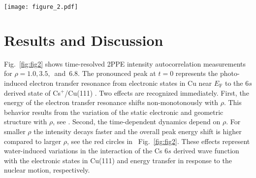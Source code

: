 \documentclass[aps,twocolumn,amssymb,amsfonts,amsmath,showpacs,final,a4paper,superscriptaddress]{revtex4-2}
\begin{document}
\begin{figure*}[t]
    \centering
    \texttt{[image: figure\_2.pdf]}
    \caption{The panels (a-c) depict measured data sets of time-resolved 2PPE intensity autocorrelations with increasing coverage ratio $\rho$ (number of water molecules per adsorbed ion) after subtraction of a time-independent background signal. In each individual panel, the intensity is shown in a false color representation as a function of time delay and intermediate state energy $E-E_{\mathrm{F}}$ at left and as spectra at selected time delays after averaging negative and positive time delays at right. The open red circles indicate the energy of the intensity maxima at the respective time delay. The data were recorded at a temperature of 80~K.}
    \label{fig:fig2}
\end{figure*}

\section {Results and Discussion}

Fig.~\ref{fig:fig2} shows time-resolved 2PPE intensity autocorrelation measurements for $\rho=1.0, 3.5,$~and~6.8. The pronounced peak at $t=0$ represents the photo-induced electron transfer resonance from electronic states in Cu near $E_{\mathrm{F}}$ to the $6s$ derived state of Cs$^+$/Cu(111) \cite{gauyacq_2007}. Two effects are recognized immediately. First, the energy of the electron transfer resonance shifts non-monotonously with $\rho$. This behavior results from the variation of the static electronic and geometric structure with $\rho$, see \cite{penschke_2023}. Second, the time-dependent dynamics depend on $\rho$. For smaller $\rho$ the intensity decays faster and the overall peak energy shift is higher compared to larger $\rho$, see the red circles in ~Fig.~\ref{fig:fig2}. These effects represent water-induced variations in the interaction of the Cs $6s$ derived wave function with the electronic states in Cu(111) and energy transfer in response to the nuclear motion, respectively.
\end{document}
